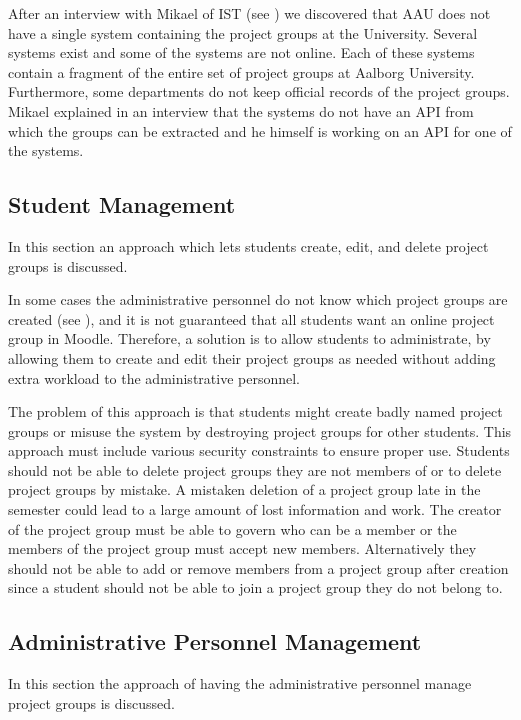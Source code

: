 After an interview with Mikael of IST (see ) we discovered that AAU does not have a single system containing the project groups at the University.
Several systems exist and some of the systems are not online.
Each of these systems contain a fragment of the entire set of project groups at Aalborg University.
Furthermore, some departments do not keep official records of the project groups.
Mikael explained in an interview that the systems do not have an API from which the groups can be extracted and he himself is working on an API for one of the systems.





\subsection{Student Management}
\label{sub:studentmangement}
In this section an approach which lets students create, edit, and delete project groups is discussed. 

In some cases the administrative personnel do not know which project groups are created (see ), and it is not guaranteed that all students want an online project group in Moodle. 
Therefore, a solution is to allow students to administrate, by allowing them to create and edit their project groups as needed without adding extra workload to the administrative personnel.

The problem of this approach is that students might create badly named project groups or misuse the system by destroying project groups for other students. 
This approach must include various security constraints to ensure proper use. 
Students should not be able to delete project groups they are not members of or to delete project groups by mistake. 
A mistaken deletion of a project group late in the semester could lead to a large amount of lost information and work. 
The creator of the project group must be able to govern who can be a member or the members of the project group must accept new members.
Alternatively they should not be able to add or remove members from a project group after creation since a student should not be able to join a project group they do not belong to. 


\subsection{Administrative Personnel Management}
In this section the approach of having the administrative personnel manage project groups is discussed. 

